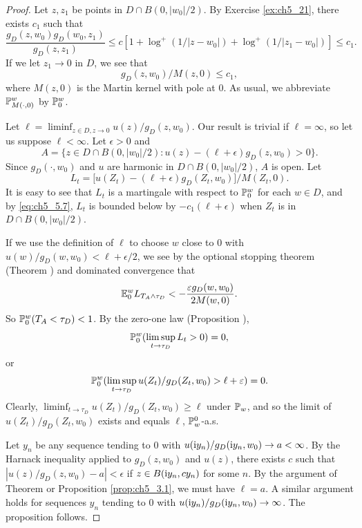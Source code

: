 \begin{proof}
Let $z, z_1$ be points in $D \cap B(0,|w_0|/2)$. By Exercise \ref{ex:ch5_21}, there exists $c_1$ such that
\[
    \frac{g_D(z,w_0)g_D(w_0,z_1)}{g_D(z,z_1)} \leq c[1 + \log^+(1/|z - w_0|) + \log^+(1/|z_1 - w_0|)] \leq c_1.
\]
If we let $z_1 \to 0$ in $D$, we see that
\begin{equation}\label{eq:ch5_5.7}
    g_D(z,w_0)/M(z,0) \leq c_1,
\end{equation}
where $M(z,0)$ is the Martin kernel with pole at $0$. As usual, we abbreviate $\P^w_{M(\cdot,0)}$ by $\P^w_0$.

Let $\ell = \liminf_{z \in D,z \to 0} u(z)/g_D(z,w_0)$. Our result is trivial if $\ell = \infty$, so let us suppose $\ell < \infty$. Let $\epsilon > 0$ and
\[
    A = \{z \in D \cap B(0,|w_0|/2) : u(z) - (\ell+\epsilon)g_D(z,w_0) > 0\}.
\]
Since $g_D(\cdot,w_0)$ and $u$ are harmonic in $D \cap B(0,|w_0|/2)$, $A$ is open. Let
\begin{equation}\label{eq:ch5_5.8}
    L_t = \big[u(Z_t) - (\ell + \epsilon)g_D(Z_t,w_0)\big]/M(Z_t,0).
\end{equation}
It is easy to see that $L_t$ is a martingale with respect to $\P^w_0$ for each $w \in D$, and by \eqref{eq:ch5_5.7}, $L_t$ is bounded below by $-c_1(\ell + \epsilon)$ when $Z_t$ is in $D \cap B(0,|w_0|/2)$.

If we use the definition of $\ell$ to choose $w$ close to $0$ with $u(w)/g_D(w,w_0) \allowbreak < \ell + \epsilon/2$, we see by the optional stopping theorem (Theorem ) and dominated convergence that
\[
    \E^w_0 L_{T_A \wedge \tau_D} < -\frac{\epsilon g_D(w,w_0)}{2M(w,0)}.
\]
So $\P^w_0(T_A < \tau_D) < 1$. By the zero-one law (Proposition ),
\[
    \P^w_0(\limsup_{t \to \tau_D} L_t > 0) = 0,
\]
or
\mpagebreak
\[
    \P^w_0(\limsup_{t \to \tau_D} u(Z_t)/g_D(Z_t,w_0) > \ell + \epsilon) = 0.
\]
Clearly, $\liminf_{t \to \tau_D} u(Z_t)/g_D(Z_t,w_0) \geq \ell$ under $\P_w$, and so the limit of $u(Z_t)/g_D(Z_t,w_0)$ exists and equals $\ell$, $\P^0_w$-a.s.

Let $y_n$ be any sequence tending to $0$ with $u(\im y_n)/g_D(\im y_n,w_0) \to a < \infty$. By the Harnack inequality applied to $g_D(z,w_0)$ and $u(z)$, there exists $c$ such that $|u(z)/g_D(z,w_0)-a| < \epsilon$ if $z \in B(\im y_n,cy_n)$ for some $n$. By the argument of Theorem  or Proposition \ref{prop:ch5_3.1}, we must have $\ell = a$. A similar argument holds for sequences $y_n$ tending to $0$ with $u(\im y_n)/g_D(\im y_n,w_0) \to \infty$. The proposition follows.
\end{proof}

